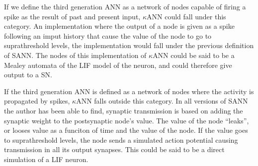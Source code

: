 If we define the third generation ANN as a network of nodes capable of firing a spike as the result of past and present input, $\kappa$ANN could fall under this category.
An implementation where the output of a node is given as a spike following an imput history that cause the value of the node to go to suprathreshold levels, the implementation would fall under the previous definition of SANN.
The nodes of this implementation of $\kappa$ANN could be said to be a Mealey automata of the LIF model of the neuron, and could therefore give output to a SN. %

If the third generation ANN is defined as a network of nodes where the activity is propagated by spikes, $\kappa$ANN falls outside this category.
In all versions of SANN the author has been able to find, synaptic transmission is based on adding the synaptic weight to the postsynaptic node's value. %
The value of the node ``leaks'', or looses value as a funciton of time and the value of the node.
If the value goes to suprathreshold levels, the node sends a simulated action potential causing transmission in all its output synapses.
This could be said to be a direct simulation of a LIF neuron.

